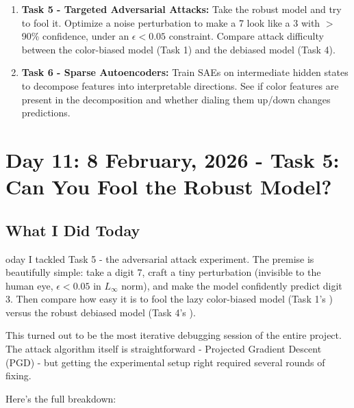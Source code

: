\documentclass[9pt,a4paper,twocolumn,twoside]{tau-class/tau}
\begin{document}
        \begin{enumerate}
            \item \textbf{Task 5 - Targeted Adversarial Attacks:} Take the robust model and try to fool it. Optimize a noise perturbation to make a 7 look like a 3 with $>$90\% confidence, under an $\epsilon < 0.05$ constraint. Compare attack difficulty between the color-biased model (Task 1) and the debiased model (Task 4).

            \item \textbf{Task 6 - Sparse Autoencoders:} Train SAEs on intermediate hidden states to decompose features into interpretable directions. See if color features are present in the decomposition and whether dialing them up/down changes predictions.
        \end{enumerate}


\section{Day 11: 8 February, 2026 - Task 5: Can You Fool the Robust Model?}

    \subsection{What I Did Today}

        oday I tackled Task 5 - the adversarial attack experiment. The premise is beautifully simple: take a digit 7, craft a tiny perturbation (invisible to the human eye, $\epsilon < 0.05$ in $L_\infty$ norm), and make the model confidently predict digit 3. Then compare how easy it is to fool the lazy color-biased model (Task 1's ) versus the robust debiased model (Task 4's ).

        This turned out to be the most iterative debugging session of the entire project. The attack algorithm itself is straightforward - Projected Gradient Descent (PGD) \cite{madry2018towards} - but getting the experimental setup right required several rounds of fixing.

        Here's the full breakdown:
\end{document}
